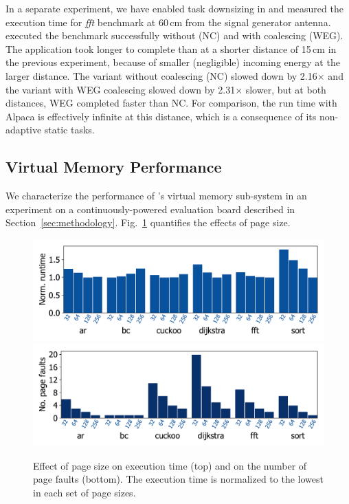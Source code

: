 In a separate experiment, we have enabled task downsizing in \sys and measured
the execution time for \textit{fft} benchmark at 60\,cm from the signal
generator antenna. \sys executed the
benchmark successfully without (NC) and with coalescing (WEG). The application
took longer to complete than at a shorter distance of 15\,cm in the previous
experiment, because of smaller (negligible) incoming energy at the larger
distance. The variant without coalescing (NC) slowed down by 2.16$\times$ and the
variant with WEG coalescing slowed down by 2.31$\times$ slower, but at both
distances, WEG completed faster than NC.
%
For comparison, the run time with Alpaca is effectively infinite at this
distance, which is a consequence of its non-adaptive static tasks.

\subsection{Virtual Memory Performance}
\label{sec:results_memory_management}

We characterize the performance of \sys's virtual memory sub-system in an
experiment on a continuously-powered evaluation board described in
Section~\ref{sec:methodology}.  Fig.~\ref{fig:page_size} quantifies the
effects of page size.
%
\begin{figure}
	\centering
	\includegraphics[width=\columnwidth]{figures/page_exec-time}
	\includegraphics[width=\columnwidth]{figures/pagePulls}
    \caption{Effect of page size on execution time (top) and on the number of
page faults (bottom). The execution time is normalized to the lowest in each set
of page sizes.}
	\label{fig:page_size}
\end{figure}
%
